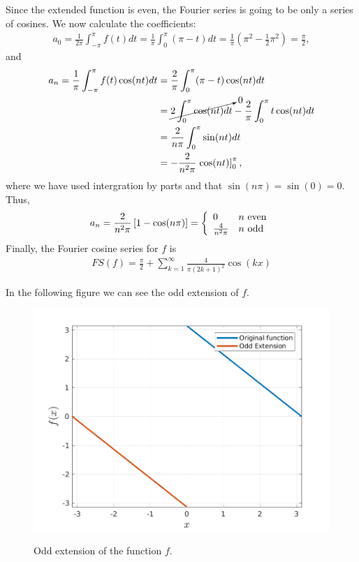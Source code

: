 \begin{questions}
\begin{solution}
Since the extended function is even, the Fourier series is going to be only a series of cosines. We now calculate the coefficients:
\begin{align*}
a_0=\frac{1}{2\pi}\int_{-\pi}^{\pi}f(t)dt=\frac{1}{\pi}\int_{0}^{\pi}(\pi-t)dt=\frac{1}{\pi}\left(\pi^2-\frac{1}{2} \pi^2\right)=\frac{\pi}{2},
\end{align*}
and
\begin{align*}
a_n=\frac{1}{\pi}\int_{-\pi}^{\pi}f(t)\cos(nt)dt&=\frac{2}{\pi}\int_{0}^{\pi}(\pi-t)\cos(nt)dt\\
&=\cancelto{0}{2\int_{0}^{\pi}\cos(nt)dt}-\frac{2}{\pi}\int_{0}^{\pi}t\cos(nt)dt\\
&=\frac{2}{n\pi}\int_{0}^{\pi}\sin(nt)dt\\
&=-\frac{2}{n^2\pi}\left.\cos(nt)\right]_0^{\pi},
\end{align*}
where we have used intergration by parts and that $\sin(n\pi)=\sin(0)=0$. Thus,
\begin{align*}
a_n=\frac{2}{n^2\pi}\left[1-\cos(n\pi)\right]= \left\{
\begin{array}{ll}
      0 & n $ even$ \\
      \frac{4}{n^2\pi} & n $ odd$ \\
\end{array} 
\right.
\end{align*}
Finally, the Fourier cosine series for $f$ is
\begin{align*}
FS(f)=\frac{\pi}{2}+\sum_{k=1}^{\infty}\frac{4}{\pi (2k+1)^2}\cos(kx)
\end{align*}
\end{solution}
\begin{solution}
In the following figure we can see the odd extension of $f$. 

\begin{figure}[H]
\centering     %
{\includegraphics[scale=0.50]{oddExtension.png}}
\caption{Odd extension of the function $f$.}
\end{figure}


\end{solution}
\end{questions}
